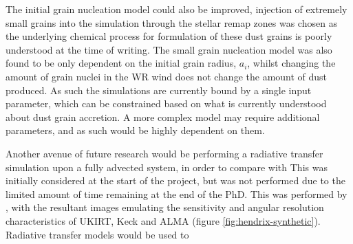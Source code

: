 
The initial grain nucleation model could also be improved, injection of extremely small grains into the simulation through the stellar remap zones was chosen as the underlying chemical process for formulation of these dust grains is poorly understood at the time of writing.
The small grain nucleation model was also found to be only dependent on the initial grain radius, $a_i$, whilst changing the amount of grain nuclei in the WR wind does not change the amount of dust produced.
As such the simulations are currently bound by a single input parameter, which can be constrained based on what is currently understood about dust grain accretion.
A more complex model may require additional parameters, and as such would be highly dependent on them.


Another avenue of future research would be performing a radiative transfer simulation upon a fully advected system, in order to compare with 
This was initially considered at the start of the project, but was not performed due to the limited amount of time remaining at the end of the PhD.
This was performed by \textcite{hendrix_pinwheels_2016}, with the resultant images emulating the sensitivity and angular resolution characteristics of UKIRT, Keck and ALMA (figure \ref{fig:hendrix-synthetic}).
Radiative transfer models would be used to 

